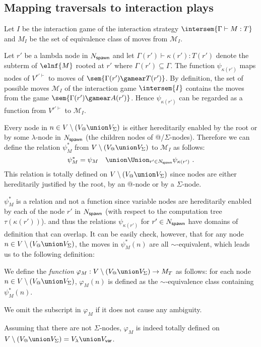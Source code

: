 \subsection{Mapping traversals to interaction plays}

    Let $I$ be the interaction game of the interaction strategy $\intersem{\Gamma \vdash M : T}$ and
    $M_I$ be the set of equivalence class of moves from $\mathcal{M}_I$.

    Let $r'$ be a lambda node in $N_{\sf spawn}$ and let $\Gamma(r') \vdash \kappa(r') : T(r')$ denote the subterm of $\elnf{M}$ rooted at $r'$ where $\Gamma(r')\subseteq \Gamma$.
    The function $\psi_{\kappa(r')}$ maps nodes of $V^{r'\vdash}$
    to moves of $\sem{\Gamma(r') \gamear T(r')}$. By definition,
    the set of possible moves $\mathcal{M}_I$ of the interaction game $\intersem{I}$ contains the
    moves from the game $\sem{\Gamma(r') \gamear A(r')}$. Hence $\psi_{\kappa(r')}$ can be regarded as a function from $V^{r'\vdash}$ to $\mathcal{M}_I$.

    Every node in $n \in V\setminus (V_@ \union V_\Sigma)$ is either hereditarily enabled by the root or by some $\lambda$-node in $N_{\sf spawn}$ (the children nodes of @/$\Sigma$-nodes). Therefore we can define the relation $\psi^*_M$ from
    $V\setminus (V_@ \union V_\Sigma)$ to $\mathcal{M}_I$ as follows:
    $$ \psi^*_M = \psi_{M} \quad \union \Union_{r' \in N_{\sf spawn}} \psi_{\kappa(r')} \ .$$
    This relation is totally defined on $V\setminus (V_@ \union V_\Sigma)$ since nodes are either hereditarily justified by the root, by an @-node or by a $\Sigma$-node.

    $\psi^*_M$ is a relation and not a function since variable nodes are hereditarily enabled by
    each of the node $r'$ in $N_{\sf spawn}$ (with respect to the computation tree $\tau(\kappa(r'))$).
    and thus the relations $\psi_{\kappa(r')}$ for $r' \in N_{\sf spawn}$ have domains of definition that can overlap.
    It can be easily check, however, that for any node $n \in V\setminus (V_@ \union V_\Sigma)$,
    the moves in $\psi^*_M (n)$ are all $\sim$-equivalent, which leads us to the following definition:
    \begin{definition}
        \label{def:phi mapping}
        We define the \emph{function}
        $\varphi_M:V\setminus (V_@ \union V_\Sigma) \rightarrow M_T$ as follows: for each node $n \in V\setminus (V_@ \union V_\Sigma)$,
        $\varphi_M(n)$ is defined as the $\sim$-equivalence class containing $\psi^*_M (n)$.

        We omit the subscript in $\varphi_M$ if it does not cause any ambiguity.
    \end{definition}
    Assuming that there are not $\Sigma$-nodes, $\varphi_M$ is indeed totally defined on $V \setminus (V_@ \union V_\Sigma) = V_\lambda \union V_{\sf var}$.

